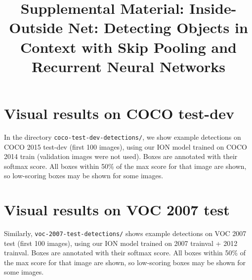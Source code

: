 \documentclass[10pt,twocolumn,letterpaper]{article}
\begin{document}
\title{%
  \vspace{-0.43em}
  Supplemental Material:
  Inside-Outside Net:
  Detecting Objects in Context with Skip Pooling and
  Recurrent Neural Networks
  \vspace{-0.43em}
}


\maketitle

\section*{Visual results on COCO test-dev}

In the directory \texttt{coco-test-dev-detections/}, we show example detections
on COCO 2015 test-dev (first 100 images), using our ION model trained on COCO
2014 train (validation images were not used).  Boxes are annotated with their
softmax score.  All boxes within 50\% of the max score for that image are shown,
so low-scoring boxes may be shown for some images.

\section*{Visual results on VOC 2007 test}

Similarly, \texttt{voc-2007-test-detections/} shows example detections on VOC
2007 test (first 100 images), using our ION model trained on 2007 trainval +
2012 trainval.  Boxes are annotated with their softmax score.  All boxes within
50\% of the max score for that image are shown, so low-scoring boxes may be
shown for some images.
\end{document}
